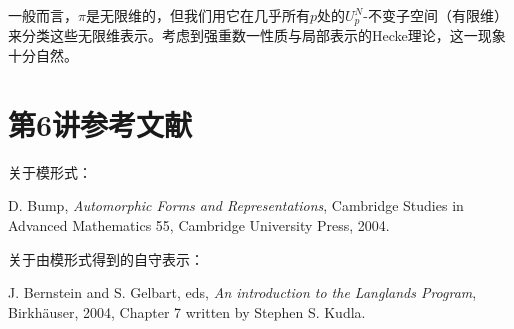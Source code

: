 \begin{note}[L6S3O2]
一般而言，$\pi$是无限维的，但我们用它在几乎所有$p$处的$U_p^N$-不变子空间（有限维）来分类这些无限维表示。考虑到强重数一性质与局部表示的Hecke理论，这一现象十分自然。
\end{note}
\section{第6讲参考文献}\label{L6S4}
关于模形式：
\begin{references} D. Bump, \textit{Automorphic Forms and Representations}, Cambridge Studies in Advanced Mathematics 55, Cambridge University Press, 2004.
\end{references}
关于由模形式得到的自守表示：
\begin{references} J. Bernstein and S. Gelbart, eds, \textit{An introduction to the Langlands Program}, Birkh\"auser, 2004, Chapter 7 written by Stephen S. Kudla.\end{references}

